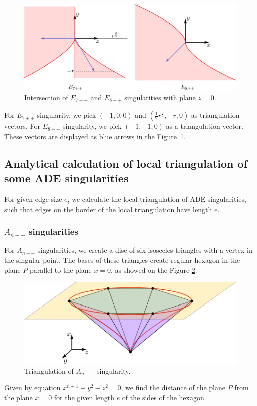 \begin{figure}
    \centerline{\includegraphics[scale=0.5]{images/img10}}
    \caption[Intersection of $E_{7++}$ and $E_{8++}$ singularities with 
    plane $z=0$.]
    {Intersection of $E_{7++}$ and $E_{8++}$ singularities with 
    plane $z=0$.}
    \label{img:10}
\end{figure}

For $E_{7++}$ singularity, we pick $(-1, 0, 0)$ and 
$(\frac{1}{2}r^{\frac{3}{2}}, -r, 0)$ as triangulation vectors.
For $E_{8++}$ singularity, we pick $(-1, -1, 0)$ as a triangulation vector.
These vectors are displayed as blue arrows in the Figure~\ref{img:10}.

\subsection{Analytical calculation of local triangulation of some ADE singularities}
For given edge size $e$, we calculate the local triangulation of ADE
singularities, such that edges on the border of the local triangulation
have length $e$.
\subsubsection*{$A_{n--}$ singularities}
\label{An--singularities}
For $A_{n--}$ singularities, we create a disc of six isosceles triangles
with a vertex in the singular point. The bases of these triangles create regular
hexagon in the plane $P$ parallel to the plane $x=0$, as showed on the Figure
\ref{img:11}.
\begin{figure}
    \centerline{\includegraphics[scale=0.5]{images/img11}}
    \caption[Triangulation of $A_{n--}$ singularity.]
    {Triangulation of $A_{n--}$ singularity.}
    \label{img:11}
\end{figure}
Given by equation $x^{n+1}-y^2-z^2=0$, we find the distance of the 
plane $P$ from the plane $x=0$ for the given length $e$ of the sides of
the hexagon.


